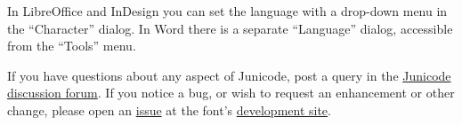 In LibreOffice and InDesign you can set the language with a drop-down menu
in the “Character” dialog. In Word there is a separate “Language” dialog,
accessible from the “Tools” menu.

If you have questions about any aspect of Junicode,
post a query in the \href{https://github.com/psb1558/Junicode-font/discussions}%
{Junicode discussion forum}. If you notice a bug, or wish to
request an enhancement or other change, please open an
\href{https://github.com/psb1558/Junicode-font/issues}{issue} at the font's
\href{https://github.com/psb1558/Junicode-font}{development site}.
